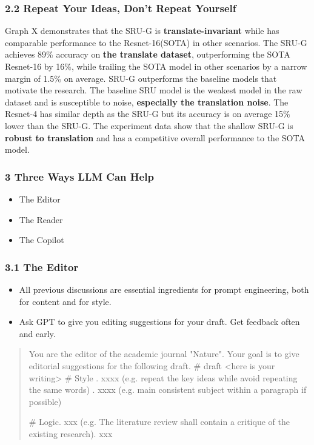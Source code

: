 \documentclass{beamer}
\begin{document}
\begin{frame}
\frametitle{2.2 Repeat Your Ideas, Don't Repeat Yourself}
Graph X demonstrates that the SRU-G is \textbf{translate-invariant} while has comparable performance to the Resnet-16(SOTA) in other scenarios.
The SRU-G achieves 89\% accuracy on \textbf{the translate dataset}, outperforming the SOTA Resnet-16 by 16\%, while trailing the SOTA model in other scenarios by a narrow margin of 1.5\% on average.
SRU-G outperforms the baseline models that motivate the research. The baseline SRU model is the weakest model in the raw dataset and is susceptible to noise, \textbf{especially the translation noise}. The Resnet-4 has similar depth as the SRU-G but its accuracy is on average 15\% lower than the SRU-G.
The experiment data show that the shallow SRU-G is \textbf{robust to translation} and has a competitive overall performance to the SOTA model.
\end{frame}


  \begin{frame}
    \frametitle{3 Three Ways LLM Can Help}
    \begin{itemize}
        \item The Editor
        \item The Reader
        \item The Copilot
    \end{itemize}
\end{frame}

\begin{frame}
\frametitle{3.1 The Editor}
\begin{itemize}
    \item All previous discussions are essential ingredients for prompt engineering, both for content and for style.
    \item Ask GPT to give you editing suggestions for your draft. Get feedback often and early.
\end{itemize}

\begin{quote}
    You are the editor of the academic journal "Nature". Your goal is to give editorial suggestions for the following draft.
    \newline
    \# draft \newline
    <here is your writing>
    \newline
    \# Style . xxxx (e.g. repeat the key ideas while avoid repeating the same words) . xxxx (e.g. main consistent subject within a paragraph if possible) \newline

    \# Logic. xxx (e.g. The literature review shall contain a critique of the existing research). xxx\newline
\end{quote}

\end{frame}   
\end{document}
